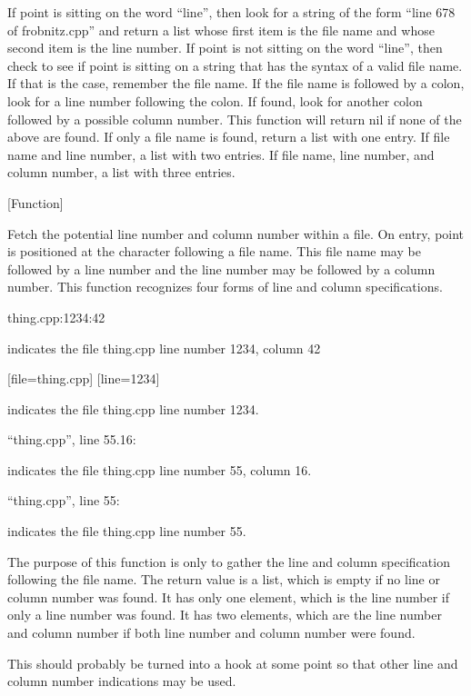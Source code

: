 \begin{doc-string}
If point is sitting on the word ``line'', then look for a string of the form
``line 678 of frobnitz.cpp'' and return a list whose first item is the file name
and whose second item is the line number.  If point is not sitting on the word ``line'',
then check to see if point is sitting on a string that has the syntax of a valid
file name.  If that is the case, remember the file name.  If the file name is
followed by a colon, look for a line number following the colon.  If found, look
for another colon followed by a possible column number.  This function will return
nil if none of the above are found.  If only a file name is found, return a list
with one entry.  If file name and line number, a list with two entries.  If file
name, line number, and column number, a list with three entries.
\end{doc-string}

\vspace{1em}
\noindent
{}
\usebox{\funcname}
 \hfill [Function]

\begin{doc-string}
Fetch the potential line number and column number within a file.  On entry,
point is positioned at the character following a file name.  This file name
may be followed by a line number and the line number may be followed by a
column number.  This function recognizes four forms of line and column
specifications.

  thing.cpp:1234:42

indicates the file thing.cpp line number 1234, column 42

  [file=thing.cpp] [line=1234]

indicates the file thing.cpp line number 1234.

  ``thing.cpp'', line 55.16:

indicates the file thing.cpp line number 55, column 16.

  ``thing.cpp'', line 55:

indicates the file thing.cpp line number 55.

The purpose of this function is only to gather the line and column
specification following the file name.  The return value is a list, which is
empty if no line or column number was found.  It has only one element, which
is the line number if only a line number was found.  It has two elements,
which are the line number and column number if both line number and column
number were found.

This should probably be turned into a hook at some point so that other line
and column number indications may be used.
\end{doc-string}

